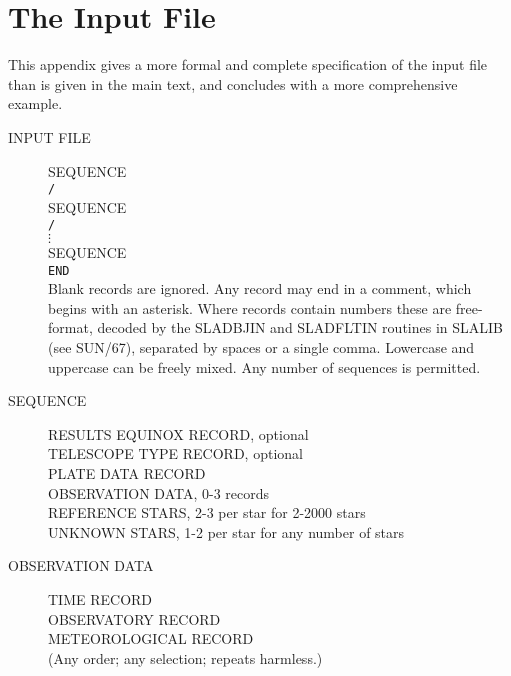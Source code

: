 \documentclass[twoside,11pt]{article}
\newcommand{\xref}[3]{#1}
\newcommand{\xlabel}[1]{}
\renewcommand{\_}{\texttt{\symbol{95}}}
\begin{document}
\newpage
\appendix
\section{\xlabel{appendix_the_input_file}The Input File}
\label{appendix_the_input_file}

This appendix gives a more formal and complete specification of
the input file than is given in the main text, and concludes
with a more comprehensive example.

\begin{description}

\item[\xlabel{INPUT_FILE}INPUT FILE]\mbox{}

 SEQUENCE \\
 \texttt{/} \\
 SEQUENCE \\
 \texttt{/} \\
 $\vdots$ \\
 SEQUENCE \\
 \texttt{END} \\
 Blank records are ignored.
 Any record may end in a comment, which begins with an asterisk.
 Where records contain numbers these are free-format, decoded by the 
 \xref{SLA\_DBJIN}{sun67}{SLA_DBJIN} and \xref{SLA\_DFLTIN}{sun67}{SLA_DFLTIN}
 routines in \xref{SLALIB}{sun67}{} (see SUN/67), separated by spaces or a 
 single comma.  Lowercase and uppercase can be freely mixed.
 Any number of sequences is permitted.

\goodbreak
\item[\xlabel{SEQUENCE}SEQUENCE]\mbox{}

 RESULTS EQUINOX RECORD, optional \\
 TELESCOPE TYPE RECORD, optional \\
 PLATE DATA RECORD \\
 OBSERVATION DATA, 0-3 records \\
 REFERENCE STARS, 2-3 per star for 2-2000 stars \\
 UNKNOWN STARS, 1-2 per star for any number of stars

\goodbreak
\item[\xlabel{OBSERVATION_DATA}OBSERVATION DATA]\mbox{}

 TIME RECORD \\
 OBSERVATORY RECORD \\
 METEOROLOGICAL RECORD \\
 (Any order; any selection; repeats harmless.)


\end{description}
\end{document}
